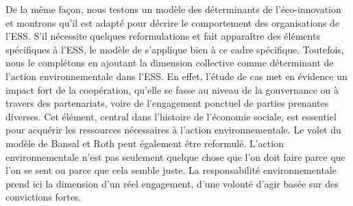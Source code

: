     De la même façon, nous testons un modèle des déterminants de l'éco-innovation et montrons qu'il est adapté pour décrire le comportement des organisations de l'ESS. S'il nécessite quelques reformulations et fait apparaître des éléments spécifiques à l'ESS, le modèle de \textcite{bansal2000why} s'applique bien à ce cadre spécifique. Toutefois, nous le complétons en ajoutant la dimension collective comme déterminant de l'action environnementale dans l'ESS. En effet, l'étude de cas met en évidence un impact fort de la coopération, qu'elle se fasse au niveau de la gouvernance ou à travers des partenariats, voire de l'engagement ponctuel de parties prenantes diverses. Cet élément, central dans l'histoire de l'économie sociale, est essentiel pour acquérir les ressources nécessaires à l'action environnementale. Le volet  du modèle de Bansal et Roth peut également être reformulé. L'action environnementale n'est pas seulement quelque chose que l'on doit faire parce que l'on se sent  ou parce que cela semble juste. La responsabilité environnementale prend ici la dimension d'un réel engagement, d'une volonté d'agir basée sur des convictions fortes. \\

